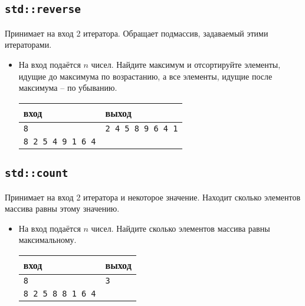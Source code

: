 \documentclass{article}
\begin{document}
\subsection*{\texttt{std::reverse}}
Принимает на вход 2 итератора. Обращает подмассив, задаваемый этими итераторами.
\begin{itemize}
\item На вход подаётся $n$ чисел. Найдите максимум и отсортируйте элементы, идущие до максимума по возрастанию, а все элементы, идущие после максимума -- по убыванию.
\begin{center}
\begin{tabular}{ l | l }
 вход & выход \\ \hline
 \texttt{8} & \texttt{2 4 5 8 9 6 4 1}  \\ 
 \texttt{8 2 5 4 9 1 6 4} &  \\
\end{tabular}
\end{center}
\end{itemize}

\subsection*{\texttt{std::count}}
Принимает на вход 2 итератора и некоторое значение. Находит сколько элементов массива равны этому значению.
\begin{itemize}
\item На вход подаётся $n$ чисел. Найдите сколько элементов массива равны максимальному.
\begin{center}
\begin{tabular}{ l | l }
 вход & выход \\ \hline
 \texttt{8} & \texttt{3}  \\ 
 \texttt{8 2 5 8 8 1 6 4} &  \\
\end{tabular}
\end{center}
\end{itemize}
\end{document}
